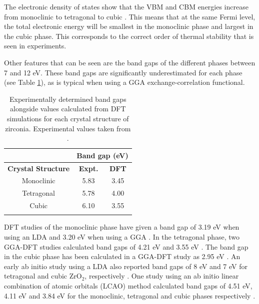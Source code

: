 The electronic density of states show that the VBM and CBM energies increase from monoclinic to tetragonal to cubic \zirconia . This means that at the same Fermi level, the total electronic energy will be smallest in the monoclinic phase and largest in the cubic phase. This corresponds to the correct order of thermal stability that is seen in experiments. 

Other features that can be seen are the band gaps of the different phases between 7 and 12 eV. These band gaps are significantly underestimated for each phase (see Table \ref{table:bandgap}), as is typical when using a GGA exchange-correlation functional.

\begin{table}[ht] %
\onehalfspacing
\centering
\caption[Experimentally determined band gaps alongside values calculated from DFT simulations for each crystal structure of zirconia.]{Experimentally determined band gaps alongside values calculated from DFT simulations for each crystal structure of zirconia. Experimental values taken from \cite{French1994}.}
\begin{tabular}{ccc}
{\bf }                                       & \multicolumn{2}{c}{{\bf Band gap (eV)}}      \\ \hline
\multicolumn{1}{c}{{\bf Crystal Structure}} & \multicolumn{1}{c}{{\bf Expt.}} & {\bf DFT} \\ \hline
\multicolumn{1}{c}{Monoclinic}              & \multicolumn{1}{c}{5.83}        & 3.45      \\
\multicolumn{1}{c}{Tetragonal}              & \multicolumn{1}{c}{5.78}        & 4.00      \\
\multicolumn{1}{c}{Cubic}                   & \multicolumn{1}{c}{6.10}         &   3.55 \\ \hline
\label{table:bandgap}
\end{tabular}
\end{table}

DFT studies of the monoclinic phase have given a band gap of 3.19 eV when using an LDA \cite{Foster2002} and 3.20 eV when using a GGA \cite{Jaffe2005}. In the tetragonal phase, two GGA-DFT studies calculated band gaps of 4.21 eV \cite{Eichler2001} and 3.55 eV \cite{Jaffe2005}. The band gap in the cubic phase has been calculated in a GGA-DFT study as 2.95 eV \cite{Jaffe2005}. An early ab initio study using a LDA also reported band gaps of 8 eV and 7 eV for tetragonal and cubic ZrO$_{2}$, respectively \cite{morinaga1983electronic}. One study using an ab initio linear combination of atomic orbitals (LCAO) method calculated band gaps of 4.51 eV, 4.11 eV and 3.84 eV for the monoclinic, tetragonal and cubic phases respectively \cite{Zandiehnadem1988}.

